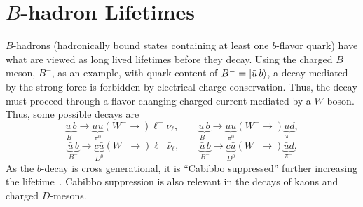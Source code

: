 \chapter{$B$-hadron Lifetimes}\label{appendix:B_hadron_lifetimes}

$B$-hadrons (hadronically bound states containing at least one $b$-flavor quark) have what are viewed as long lived lifetimes before they decay.
Using the charged $B$ meson, $B^{-}$, as an example, with quark content of $B^{-} = \Ket{\bar{u}\, b}$, a decay mediated by the strong force is forbidden by electrical charge conservation.
Thus, the decay must proceed through a flavor-changing charged current mediated by a $W$ boson.
Thus, some possible decays are
\[
 \underbrace{\bar{u}\,b}_{B^{-}} \to \underbrace{u\bar{u}}_{\pi^0} \left(W^{-} \to\right) \ell^{-} \bar{\nu}_{\ell}, \qquad \underbrace{\bar{u}\,b}_{B^{-}} \to \underbrace{u\bar{u}}_{\pi^0} \left(W^{-} 	\to \right) \underbrace{\bar{u}d}_{\pi^-},
\]
%
\[
 \underbrace{\bar{u}\,b}_{B^{-}} \to \underbrace{c\bar{u}}_{D^0} \left(W^{-} \to \right) \ell^{-} \bar{\nu}_{\ell}, \qquad \underbrace{\bar{u}\,b}_{B^{-}} \to \underbrace{c\bar{u}}_{D^0} \left(W^{-} \to \right) \underbrace{\bar{u}d}_{\pi^-}.
\]
As the $b$-decay is cross generational, it is ``Cabibbo suppressed'' further increasing the lifetime~\cite{Vaandering}.
Cabibbo suppression is also relevant in the decays of kaons and charged $D$-mesons.

